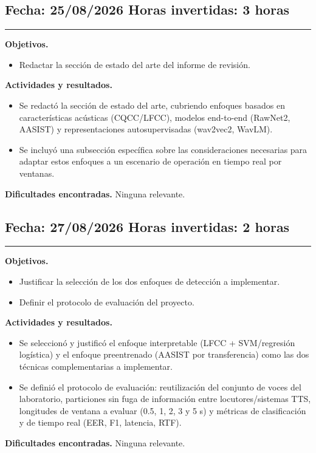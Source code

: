 \documentclass[11pt]{article}
\newenvironment{sesion}[2]{%
  \subsection*{Fecha: #1 \hfill Horas invertidas: #2}
  \vspace{-0.3cm}
  \hrule
  \vspace{0.3cm}
}{\vspace{0.5cm}}
\newcommand{\campo}[1]{\textbf{#1}}
\begin{document}
\begin{sesion}{25/08/2026}{3 horas}
\campo{Objetivos.}
\begin{itemize}
\item Redactar la sección de estado del arte del informe de revisión.
\end{itemize}
\campo{Actividades y resultados.}
\begin{itemize}
\item Se redactó la sección de estado del arte, cubriendo enfoques basados en características acústicas (CQCC/LFCC), modelos end-to-end (RawNet2, AASIST) y representaciones autosupervisadas (wav2vec2, WavLM).
\item Se incluyó una subsección específica sobre las consideraciones necesarias para adaptar estos enfoques a un escenario de operación en tiempo real por ventanas.
\end{itemize}
\campo{Dificultades encontradas.} Ninguna relevante.
\end{sesion}

\begin{sesion}{27/08/2026}{2 horas}
\campo{Objetivos.}
\begin{itemize}
\item Justificar la selección de los dos enfoques de detección a implementar.
\item Definir el protocolo de evaluación del proyecto.
\end{itemize}
\campo{Actividades y resultados.}
\begin{itemize}
\item Se seleccionó y justificó el enfoque interpretable (LFCC + SVM/regresión logística) y el enfoque preentrenado (AASIST por transferencia) como las dos técnicas complementarias a implementar.
\item Se definió el protocolo de evaluación: reutilización del conjunto de voces del laboratorio, particiones sin fuga de información entre locutores/sistemas TTS, longitudes de ventana a evaluar (0.5, 1, 2, 3 y 5 s) y métricas de clasificación y de tiempo real (EER, F1, latencia, RTF).
\end{itemize}
\campo{Dificultades encontradas.} Ninguna relevante.
\end{sesion}
\end{document}
